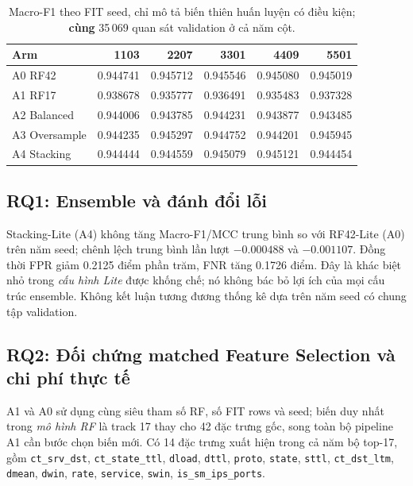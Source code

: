 \begin{table}[htbp]\centering
\small
\renewcommand{\arraystretch}{1.25}
\setlength{\tabcolsep}{7pt}
\caption{Macro-F1 theo FIT seed, chỉ mô tả biến thiên huấn luyện có điều kiện; \textbf{cùng} 35\,069 quan sát validation ở cả năm cột.}
\label{tab:p21-by-seed}
\begin{tabular}{lrrrrr}
\toprule
Arm & 1103 & 2207 & 3301 & 4409 & 5501\\\midrule
A0 RF42 & 0.944741 & 0.945712 & 0.945546 & 0.945080 & 0.945019\\
A1 RF17 & 0.938678 & 0.935777 & 0.936491 & 0.935483 & 0.937328\\
A2 Balanced & 0.944006 & 0.943785 & 0.944231 & 0.943877 & 0.943485\\
A3 Oversample & 0.944235 & 0.945297 & 0.944752 & 0.944201 & 0.945945\\
A4 Stacking & 0.944444 & 0.944559 & 0.945079 & 0.945121 & 0.944454\\\bottomrule
\end{tabular}
\end{table}

\subsection{RQ1: Ensemble và đánh đổi lỗi}
Stacking-Lite (A4) không tăng Macro-F1/MCC trung bình so với RF42-Lite (A0) trên năm seed; chênh lệch trung bình lần lượt $-0.000488$ và $-0.001107$. Đồng thời FPR giảm 0.2125 điểm phần trăm, FNR tăng 0.1726 điểm. Đây là khác biệt nhỏ trong \emph{cấu hình Lite} được khống chế; nó không bác bỏ lợi ích của mọi cấu trúc ensemble. Không kết luận tương đương thống kê dựa trên năm seed có chung tập validation.

\subsection{RQ2: Đối chứng matched Feature Selection và chi phí thực tế}
A1 và A0 sử dụng cùng siêu tham số RF, số FIT rows và seed; biến duy nhất trong \emph{mô hình RF} là track 17 thay cho 42 đặc trưng gốc, song toàn bộ pipeline A1 cần bước chọn biến mới. Có 14 đặc trưng xuất hiện trong cả năm bộ top-17, gồm \texttt{ct\_srv\_dst}, \texttt{ct\_state\_ttl}, \texttt{dload}, \texttt{dttl}, \texttt{proto}, \texttt{state}, \texttt{sttl}, \texttt{ct\_dst\_ltm}, \texttt{dmean}, \texttt{dwin}, \texttt{rate}, \texttt{service}, \texttt{swin}, \texttt{is\_sm\_ips\_ports}.

